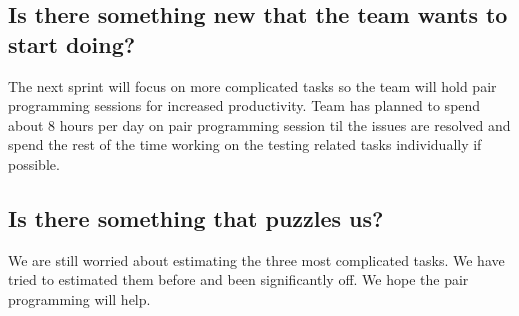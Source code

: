 \subsection*{Is there something new that the team wants to start doing?}
The next sprint will focus on more complicated tasks so the team will hold pair programming sessions for increased productivity. Team has planned to spend about 8 hours per day on pair programming session til the issues are resolved and spend the rest of the time working on the testing related tasks individually if possible.

\subsection*{ Is there something that puzzles us?}
We are still worried about estimating the three most complicated tasks. We have tried to estimated them before and been significantly off. We hope the pair programming will help.

\newpage
